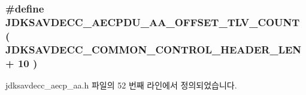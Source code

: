 \subsubsection[{\texorpdfstring{J\+D\+K\+S\+A\+V\+D\+E\+C\+C\+\_\+\+A\+E\+C\+P\+D\+U\+\_\+\+A\+A\+\_\+\+O\+F\+F\+S\+E\+T\+\_\+\+T\+L\+V\+\_\+\+C\+O\+U\+NT}{JDKSAVDECC_AECPDU_AA_OFFSET_TLV_COUNT}}]{\setlength{\rightskip}{0pt plus 5cm}\#define J\+D\+K\+S\+A\+V\+D\+E\+C\+C\+\_\+\+A\+E\+C\+P\+D\+U\+\_\+\+A\+A\+\_\+\+O\+F\+F\+S\+E\+T\+\_\+\+T\+L\+V\+\_\+\+C\+O\+U\+NT~( {\bf J\+D\+K\+S\+A\+V\+D\+E\+C\+C\+\_\+\+C\+O\+M\+M\+O\+N\+\_\+\+C\+O\+N\+T\+R\+O\+L\+\_\+\+H\+E\+A\+D\+E\+R\+\_\+\+L\+EN} + 10 )}\hypertarget{group___a_e_c_p___a_a__offsets_ga3365cbf982525053196ab7f3351abad1}{}\label{group___a_e_c_p___a_a__offsets_ga3365cbf982525053196ab7f3351abad1}


jdksavdecc\+\_\+aecp\+\_\+aa.\+h 파일의 52 번째 라인에서 정의되었습니다.


